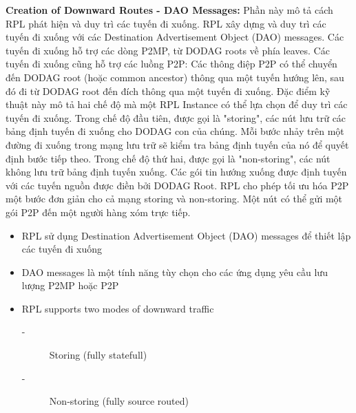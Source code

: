\documentclass{report}
\begin{document}
\textbf{Creation of Downward Routes - DAO Messages:} Phần này mô tả cách RPL phát hiện và duy trì các tuyến đi xuống. RPL xây dựng và duy trì các tuyến đi xuống với các Destination Advertisement Object (DAO) messages. Các tuyến đi xuống hỗ trợ các dòng P2MP, từ DODAG roots về phía leaves. Các tuyến đi xuống cũng hỗ trợ các luồng P2P: Các thông điệp P2P có thể chuyển đến DODAG root (hoặc common ancestor) thông qua một tuyến hướng lên, sau đó đi từ DODAG root đến đích thông qua một tuyến đi xuống. Đặc điểm kỹ thuật này mô tả hai chế độ mà một RPL Instance có thể lựa chọn để duy trì các tuyến đi xuống. Trong chế độ đầu tiên, được gọi là "storing", các nút lưu trữ các bảng định tuyến đi xuống cho DODAG con của chúng. Mỗi bước nhảy trên một đường đi xuống trong mạng lưu trữ sẽ kiểm tra bảng định tuyến của nó để quyết định bước tiếp theo. Trong chế độ thứ hai, được gọi là "non-storing", các nút không lưu trữ bảng định tuyến xuống. Các gói tin hướng xuống được định tuyến với các tuyến nguồn được điền bởi DODAG Root. RPL cho phép tối ưu hóa P2P một bước đơn giản cho cả mạng storing và non-storing. Một nút có thể gửi một gói P2P đến một người hàng xóm trực tiếp.
\begin{itemize}
	\item RPL sử dụng Destination Advertisement Object (DAO) messages để thiết lập các tuyến đi xuống
	\item DAO messages là một tính năng tùy chọn cho các ứng dụng yêu cầu lưu lượng P2MP hoặc P2P
	\item RPL supports two modes of downward traffic
	\begin{description}
		\item[-] Storing (fully statefull)
		\item[-] Non‐storing (fully source routed)
	\end{description}
\end{itemize}
\end{document}
